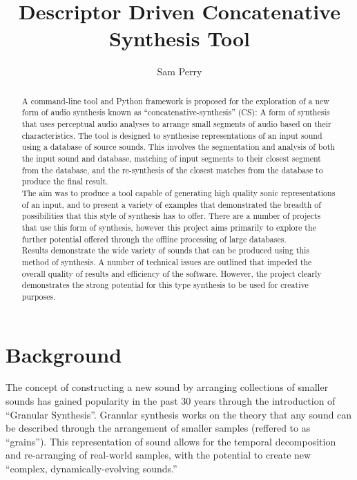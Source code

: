 \documentclass{scrartcl}
\begin{document}
    \title{Descriptor Driven Concatenative Synthesis Tool}
    \author{Sam Perry}

    \maketitle

    \begin{abstract} 
    A command-line tool and Python framework is proposed for the exploration of
    a new form of audio synthesis known as ``concatenative-synthesis'' (CS): A
    form of synthesis that uses perceptual audio analyses to arrange small
    segments of audio based on their characteristics.  The tool is designed to
    synthesise representations of an input sound using a database of source
    sounds. This involves the segmentation and analysis of both the input sound
    and database, matching of input segments to their closest segment from the
    database, and the re-synthesis of the closest matches from the database to
    produce the final result.\\

    The aim was to produce a tool capable of generating high quality sonic
    representations of an input, and to present a variety of examples that
    demonstrated the breadth of possibilities that this style of synthesis has
    to offer. There are a number of projects that use this form of synthesis,
    however this project aims primarily to explore the further potential
    offered through the offline processing of large databases.\\

    Results demonstrate the wide variety of sounds that can be produced using
    this method of synthesis. A number of technical issues are outlined that
    impeded the overall quality of results and efficiency of the software.
    However, the project clearly demonstrates the strong potential for this
    type synthesis to be used for creative purposes.
    \end{abstract}

    \section*{Background}
    The concept of constructing a new sound by arranging collections of smaller
    sounds has gained popularity in the past 30 years through the introduction
    of ``Granular Synthesis''. Granular synthesis works on the theory that any
    sound can be described through the arrangement of smaller samples (reffered
    to as ``grains''). This representation of sound allows for the temporal
    decomposition and re-arranging of real-world samples, with the potential to
    create new ``complex, dynamically-evolving
    sounds.''~\parencite[p.1]{Roads1988}\\
\end{document}
